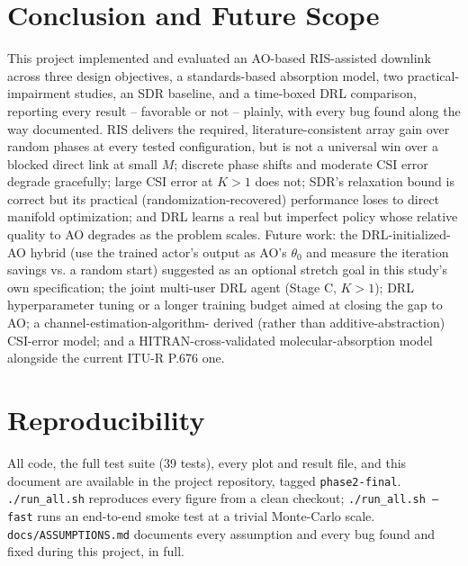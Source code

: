 \documentclass[conference]{IEEEtran}
\newcommand{\IRS}{RIS}
\begin{document}
\section{Conclusion and Future Scope}
\label{sec:future}
This project implemented and evaluated an AO-based \IRS{}-assisted
downlink across three design objectives, a standards-based absorption
model, two practical-impairment studies, an SDR baseline, and a
time-boxed DRL comparison, reporting every result -- favorable or not --
plainly, with every bug found along the way documented. \IRS{} delivers
the required, literature-consistent array gain over random phases at
every tested configuration, but is not a universal win over a blocked
direct link at small $M$; discrete phase shifts and moderate CSI error
degrade gracefully; large CSI error at $K{>}1$ does not; SDR's
relaxation bound is correct but its practical (randomization-recovered)
performance loses to direct manifold optimization; and DRL learns a
real but imperfect policy whose relative quality to AO degrades as the
problem scales. Future work: the DRL-initialized-AO hybrid (use the
trained actor's output as AO's $\theta_0$ and measure the iteration
savings vs. a random start) suggested as an optional stretch goal in
this study's own specification; the joint multi-user DRL agent
(Stage C, $K{>}1$); DRL hyperparameter tuning or a longer training
budget aimed at closing the gap to AO; a channel-estimation-algorithm-
derived (rather than additive-abstraction) CSI-error model; and a
HITRAN-cross-validated molecular-absorption model alongside the current
ITU-R P.676 one.

\section*{Reproducibility}
All code, the full test suite (39 tests), every plot and result file,
and this document are available in the project repository, tagged
\texttt{phase2-final}. \texttt{./run\_all.sh} reproduces every figure
from a clean checkout; \texttt{./run\_all.sh~--fast} runs an end-to-end
smoke test at a trivial Monte-Carlo scale. \texttt{docs/ASSUMPTIONS.md}
documents every assumption and every bug found and fixed during this
project, in full.



\end{document}
